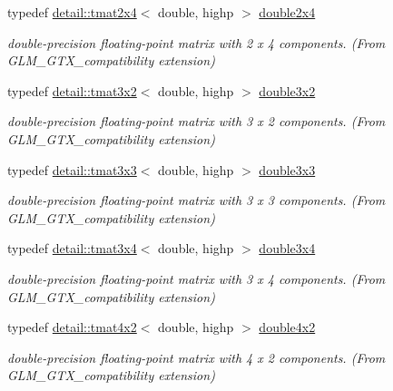 \begin{DoxyCompactItemize}
typedef \hyperlink{structglm_1_1detail_1_1tmat2x4}{detail\+::tmat2x4}$<$ double, highp $>$ \hyperlink{group__gtx__compatibility_ga063ad3c07c7650955da6ec55819f11fe}{double2x4}
\begin{DoxyCompactList}\small\item\em double-\/precision floating-\/point matrix with 2 x 4 components. (From G\+L\+M\+\_\+\+G\+T\+X\+\_\+compatibility extension) \end{DoxyCompactList}\item 
typedef \hyperlink{structglm_1_1detail_1_1tmat3x2}{detail\+::tmat3x2}$<$ double, highp $>$ \hyperlink{group__gtx__compatibility_ga1f70107ac850f512ac4e09737e1f85b7}{double3x2}
\begin{DoxyCompactList}\small\item\em double-\/precision floating-\/point matrix with 3 x 2 components. (From G\+L\+M\+\_\+\+G\+T\+X\+\_\+compatibility extension) \end{DoxyCompactList}\item 
typedef \hyperlink{structglm_1_1detail_1_1tmat3x3}{detail\+::tmat3x3}$<$ double, highp $>$ \hyperlink{group__gtx__compatibility_ga2b56fa7536ae728c64fde99d6618139a}{double3x3}
\begin{DoxyCompactList}\small\item\em double-\/precision floating-\/point matrix with 3 x 3 components. (From G\+L\+M\+\_\+\+G\+T\+X\+\_\+compatibility extension) \end{DoxyCompactList}\item 
typedef \hyperlink{structglm_1_1detail_1_1tmat3x4}{detail\+::tmat3x4}$<$ double, highp $>$ \hyperlink{group__gtx__compatibility_gab38107892c0116610e7de83126aff405}{double3x4}
\begin{DoxyCompactList}\small\item\em double-\/precision floating-\/point matrix with 3 x 4 components. (From G\+L\+M\+\_\+\+G\+T\+X\+\_\+compatibility extension) \end{DoxyCompactList}\item 
typedef \hyperlink{structglm_1_1detail_1_1tmat4x2}{detail\+::tmat4x2}$<$ double, highp $>$ \hyperlink{group__gtx__compatibility_ga816d1a516a5ec13511fe1ae703ddcf94}{double4x2}
\begin{DoxyCompactList}\small\item\em double-\/precision floating-\/point matrix with 4 x 2 components. (From G\+L\+M\+\_\+\+G\+T\+X\+\_\+compatibility extension) \end{DoxyCompactList}\item 

\end{DoxyCompactItemize}
